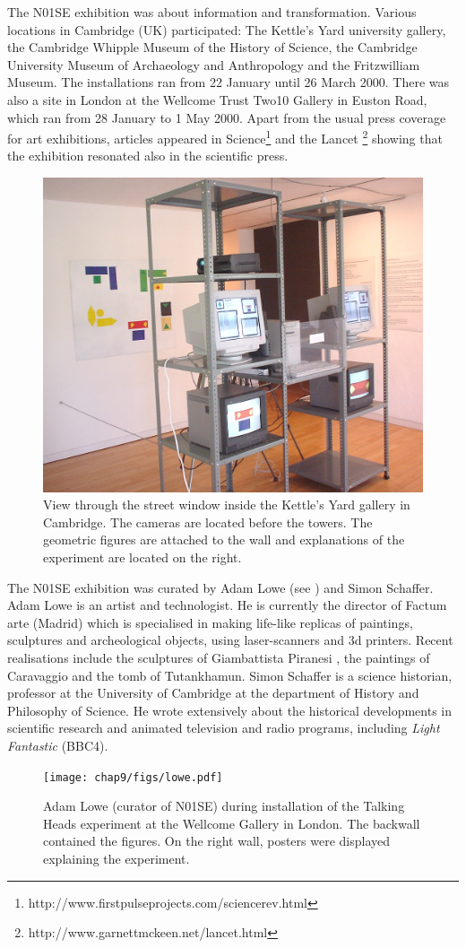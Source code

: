 The N01SE exhibition was about information and transformation. 
Various locations in Cambridge (UK) participated: The Kettle's Yard university gallery, 
the Cambridge Whipple Museum of the History of Science, the Cambridge University Museum of 
Archaeology and Anthropology and the 
Fritzwilliam Museum. The installations ran from 22 January until 26 March 2000. There was also a site 
in London at the Wellcome Trust Two10 Gallery in Euston Road, which 
ran from 28 January to 1 May 2000. Apart from the usual press coverage for art exhibitions, articles appeared in
Science\footnote{http://www.firstpulseprojects.com/sciencerev.html}
and the Lancet \footnote{http://www.garnettmckeen.net/lancet.html}
showing that the exhibition resonated also in the scientific press. 

\begin{figure}[htbp]
  \centerline{\includegraphics[width=.75\textwidth]{chap9/figs/cambridge-view.jpg}}
\caption{\label{fig:sideview}View through the street window inside the Kettle's Yard gallery in Cambridge. The cameras are located before 
the towers. The geometric figures are attached to the wall and explanations of the experiment are located on the right.}
\end{figure}

The N01SE exhibition was curated by Adam Lowe (see ) and Simon Schaffer. 
Adam Lowe is an artist and technologist. He is currently the director of Factum arte (Madrid) which is specialised 
in making life-like replicas of paintings, sculptures and archeological objects, using laser-scanners and 3d printers. 
Recent realisations include the sculptures of Giambattista Piranesi \citep{Lowe:2010}, the 
paintings of Caravaggio and the tomb of Tutankhamun. 
Simon Schaffer is a science historian, professor at the University of Cambridge at the department of History and Philosophy 
of Science. He wrote extensively about the historical developments in scientific research \citep{Schaffer:2011}
and animated television and radio programs, including {\itshape Light Fantastic} (BBC4). 
\begin{figure}[htbp]
  \centerline{\texttt{[image: chap9/figs/lowe.pdf]}}
\caption{\label{fig:lowe}Adam Lowe (curator of N01SE) during installation of the Talking Heads experiment at the Wellcome Gallery in London. 
The backwall contained the figures. On the right wall, posters were displayed explaining the experiment.}
\end{figure}

